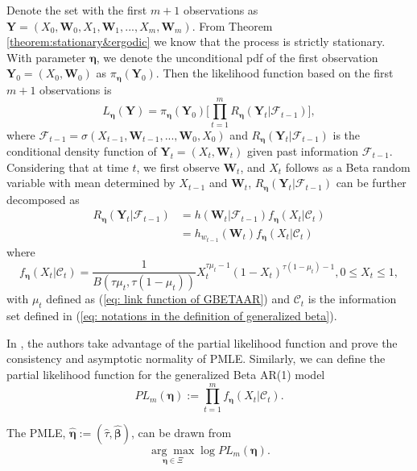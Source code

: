 \documentclass{article}
\theoremstyle{definition}
\begin{document}
Denote the set with the first $m+1$ observations as $\bm{Y} = (X_0,\bm{W}_0,X_1,\bm{W}_1,...,X_m,\bm{W}_m)$. From Theorem \ref{theorem:stationary&ergodic} we know that the process is strictly stationary. With parameter $\bm{\eta}$, we denote the unconditional pdf of the first observation $\bm{Y}_0 = (X_0,\bm{W}_0)$ as $\pi_{\bm{\eta}}(\bm{Y}_0).$ Then the likelihood function based on the first $m+1$ observations is 
\begin{equation*}
    L_{\bm{\eta}}(\bm{Y}) = \pi_{\bm{\eta}}(\bm{Y}_0) \Big[\prod_{t=1}^m R_{\bm{\eta}}(\bm{Y}_t| \mathcal{F}_{t-1}) \Big],
\end{equation*}
 where $\mathcal{F}_{t-1} = \sigma( X_{t-1},\bm{W}_{t-1},...,\bm{W}_0, X_0)$ and $R_{\bm{\eta}}(\bm{Y}_t| \mathcal{F}_{t-1})$ is the conditional density function of $\bm{Y}_{t} = (X_t,\bm{W}_t)$ given past information $\mathcal{F}_{t-1}$.
 Considering that at time $t$, we first observe $\bm{W}_{t}$, and $X_t$ follows as a Beta random variable with mean determined by $X_{t-1}$ and $\bm{W}_t$, $R_{\bm{\eta}}(\bm{Y}_t|\mathcal{F}_{t-1})$ can be further decomposed as 
 \begin{equation*}
 \begin{aligned}
       R_{\bm{\eta}}(\bm{Y}_t|\mathcal{F}_{t-1}) &= h(\bm{W}_t|\mathcal{F}_{t-1}) f_{\bm{\eta}}(X_t|\mathcal{C}_{t}) \\
       & = h_{w_{t-1}}(\bm{W}_{t})f_{\bm{\eta}}(X_t|\mathcal{C}_t)
 \end{aligned}
 \end{equation*}
where 
\begin{equation}
\label{eq: beta ar conditional density function of X_t given C_t}
    f_{\bm{\eta}}(X_t|\mathcal{C}_{t}) = \frac{1}{B(\tau \mu_t, \tau (1-\mu_t))}X_t^{\tau \mu_t-1}(1-X_t)^{\tau(1-\mu_t)-1}, 0\leq X_t\leq1,
\end{equation}
with $\mu_t$ defined as (\ref{eq: link function of GBETAAR}) and $\mathcal{C}_t$ is the information set defined in (\ref{eq: notations in the definition of generalized beta}).  

In \cite{Liu_2025}, the authors take advantage of the partial likelihood function and prove the consistency and asymptotic normality of PMLE. Similarly, we can define the partial likelihood function for the generalized Beta AR(1) model $$PL_{m}(\bm{\eta}):= \prod_{t=1}^m f_{\bm{\eta}}(X_t|\mathcal{C}_{t}).$$

The PMLE, $\hat{\bm{\eta}} := (\hat{\tau},\hat{\bm{\beta}})$, can be drawn from
\begin{equation}
\label{eq: PMLE objective function}
    \underset{\bm{\eta} \in \Xi}{\arg\max} \log PL_{m}(\bm{\eta}).
\end{equation}
\end{document}
